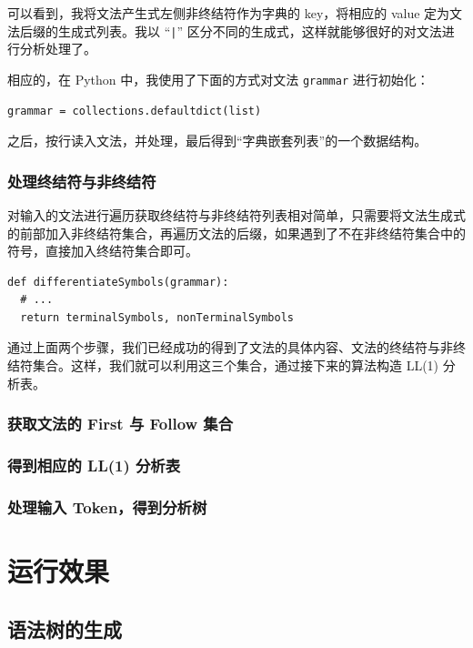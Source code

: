 \documentclass[UTF8]{ctexart}
\begin{document}
可以看到，我将文法产生式左侧非终结符作为字典的 key，将相应的 value 定为文法后缀的生成式列表。我以 “\texttt{|}” 区分不同的生成式，这样就能够很好的对文法进行分析处理了。

相应的，在 Python 中，我使用了下面的方式对文法 \texttt{grammar} 进行初始化：

\begin{verbatim}
grammar = collections.defaultdict(list)
\end{verbatim}

之后，按行读入文法，并处理，最后得到“字典嵌套列表”的一个数据结构。

\subsubsection{处理终结符与非终结符}
对输入的文法进行遍历获取终结符与非终结符列表相对简单，只需要将文法生成式的前部加入非终结符集合，再遍历文法的后缀，如果遇到了不在非终结符集合中的符号，直接加入终结符集合即可。

\begin{verbatim}
def differentiateSymbols(grammar):
  # ...
  return terminalSymbols, nonTerminalSymbols
\end{verbatim}

通过上面两个步骤，我们已经成功的得到了文法的具体内容、文法的终结符与非终结符集合。这样，我们就可以利用这三个集合，通过接下来的算法构造 LL(1) 分析表。

\subsubsection{获取文法的 First 与 Follow 集合}

\subsubsection{得到相应的 LL(1) 分析表}

\subsubsection{处理输入 Token，得到分析树}

\section{运行效果}
\subsection{语法树的生成}
\end{document}
